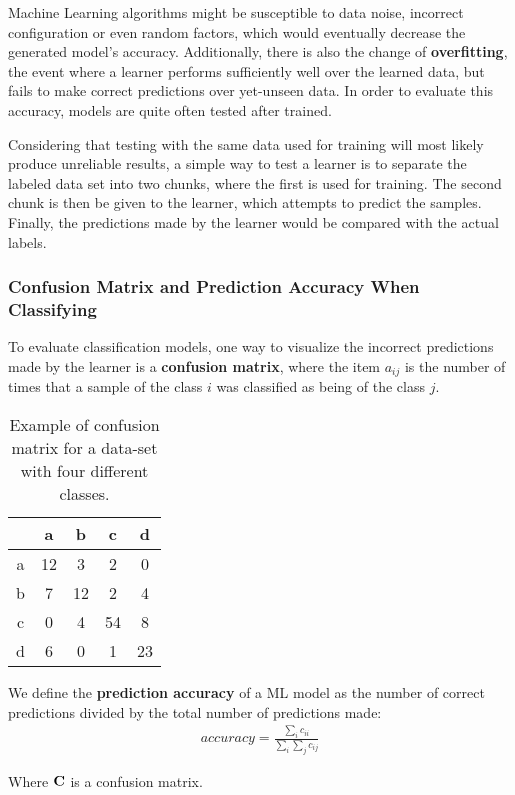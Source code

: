 Machine Learning algorithms might be susceptible to data noise, incorrect configuration or even random factors, which would eventually decrease the generated model's accuracy. Additionally, there is also the change of \textbf{overfitting}, the event where a learner performs sufficiently well over the learned data, but fails to make correct predictions over yet-unseen data. In order to evaluate this accuracy, models are quite often tested after trained.

Considering that testing with the same data used for training will most likely produce unreliable results, a simple way to test a learner is to separate the labeled data set into two chunks, where the first is used for training. The second chunk is then be given to the learner, which attempts to predict the samples. Finally, the predictions made by the learner would be compared with the actual labels.

\subsubsection{Confusion Matrix and Prediction Accuracy When Classifying}

To evaluate classification models, one way to visualize the incorrect predictions made by the learner is a \textbf{confusion matrix}, where the item $a_{ij}$ is the number of times that a sample of the class $i$ was classified as being of the class $j$.

\begin{table}[H]
	\centering
	\begin{tabular}{*{4}{c|}c}
          &  a &  b &  c &  d \\\hline
		a & 12 &  3 &  2 &  0 \\
		b &  7 & 12 &  2 &  4 \\
		c &  0 &  4 & 54 &  8 \\
		d &  6 &  0 &  1 & 23
	\end{tabular}

	\caption{Example of confusion matrix for a data-set with four different classes.}
\end{table}

We define the \textbf{prediction accuracy} of a ML model as the number of correct predictions divided by the total number of predictions made:
\begin{align*}
	accuracy = \frac{\sum_i c_{ii}}{\sum_i \sum _j c_{ij}}
\end{align*}

Where $\mathbf{C}$ is a confusion matrix.

